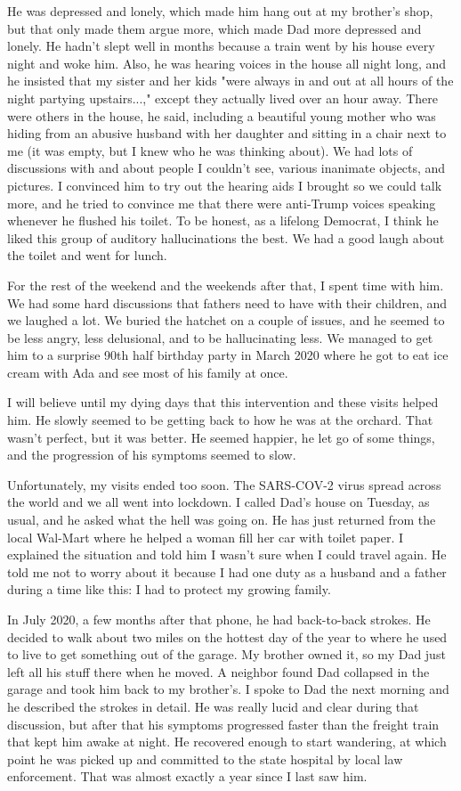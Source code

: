 \documentclass{article}
\begin{document}
He was depressed and lonely, which made him hang out at my brother's shop, but that only made them argue more, which made Dad more depressed and lonely. He hadn't slept well in months because a train went by his house every night and woke him. Also, he was hearing voices in the house all night long, and he insisted that my sister and her kids "were always in and out at all hours of the night partying upstairs...," except they actually lived over an hour away. There were others in the house, he said, including a beautiful young mother who was hiding from an abusive husband with her daughter and sitting in a chair next to me (it was empty, but I knew who he was thinking about).  We had lots of discussions with and about people I couldn't see, various inanimate objects, and pictures. I convinced him to try out the hearing aids I brought so we could talk more, and he tried to convince me that there were anti-Trump voices speaking whenever he flushed his toilet. To be honest, as a lifelong Democrat, I think he liked this group of auditory hallucinations the best.  We had a good laugh about the toilet and went for lunch.

For the rest of the weekend and the weekends after that, I spent time with him. We had some hard discussions that fathers need to have with their children, and we laughed a lot. We buried the hatchet on a couple of issues, and he seemed to be less angry, less delusional, and to be hallucinating less. We managed to get him to a surprise 90th half birthday party in March 2020 where he got to eat ice cream with Ada and see most of his family at once.

I will believe until my dying days that this intervention and these visits helped him. He slowly seemed to be getting back to how he was at the orchard. That wasn't perfect, but it was better. He seemed happier, he let go of some things, and the progression of his symptoms seemed to slow. 

Unfortunately, my visits ended too soon. The SARS-COV-2 virus spread across the world and we all went into lockdown. I called Dad's house on Tuesday, as usual, and he asked what the hell was going on. He has just returned from the local Wal-Mart where he helped a woman fill her car with toilet paper. I explained the situation and told him I wasn't sure when I could travel again. He told me not to worry about it because I had one duty as a husband and a father during a time like this: I had to protect my growing family.

In July 2020, a few months after that phone, he had back-to-back strokes. He decided to walk about two miles on the hottest day of the year to where he used to live to get something out of the garage. My brother owned it, so my Dad just left all his stuff there when he moved. A neighbor found Dad collapsed in the garage and took him back to my brother's. I spoke to Dad the next morning and he described the strokes in detail. He was really lucid and clear during that discussion, but after that his symptoms progressed faster than the freight train that kept him awake at night. He recovered enough to start wandering, at which point he was picked up and committed to the state hospital by local law enforcement. That was almost exactly a year since I last saw him. 
\end{document}
